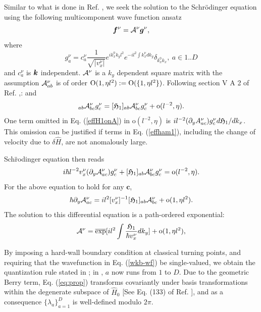 \documentclass[aps, showpacs, twocolumn, notitlepage, superscriptaddress]{revtex4-1}
\begin{document}
Similar to what is done in Ref. , we seek the solution to the Schr\"odinger equation using the following multicomponent wave function ansatz
\begin{equation}
\boldsymbol{f}^\nu={\cal A}^\nu\boldsymbol{g}^\nu,\label{wkb-wf}
\end{equation}
where 
\begin{equation}
g_a^\nu=c_{a}^\nu\frac{1}{\sqrt{|v_x^\nu|}}e^{ik^{0}_{x}k_{y}l^{2}}e^{-il^{2}\int k_{x}^\nu dk_{y}}\delta_{k^{0}_{x}k_{x}},~a\in{1..D}
\end{equation}
and $c_a^\nu$ is $\boldsymbol{k}$ independent. ${\cal A}^\nu$ is a $k_y$ dependent square matrix with the assumption ${\cal A}_{ab}^\nu$ is of order $\text{O}(1, \eta l^2):=\text{O}(\{1,\eta l^2\})$. Following section V A 2 of Ref. ,:
and
\begin{equation}
[\effH_{1}(\bK)]_{ab}\A_{bc}^\nu g_{c}^\nu=[\effH_{1}]_{ab}\A_{bc}^\nu g_{c}^\nu+\text{o}(l^{-2}, \eta).\label{effH1onA}
\end{equation}
One term omitted in Eq. (\ref{effH1onA}) in $\text{o}(l^{-2},\eta)$ is $i l^{-2}(\partial_{y}A_{ac}^\nu)g_{c}^\nu d\mathfrak{H}_1/dk_x$. This omission can be justified if terms in Eq. ({\ref{effham1}}), including the change of velocity due to $\delta\hat{H}$, are not anomalously large.

Sch\"rodinger equation then reads 
\begin{equation}
i\hbar l^{-2} v_{x}^\nu (\partial_{y}{\cal A}_{ac}^\nu)  g_{c}^\nu+[\mathfrak{H}_{1}]_{ab}{\cal A}_{bc}^\nu g_{c}^\nu=\text{o}(l^{-2}, \eta).
\end{equation}
For the above equation to hold for any $\mathbf{c}$,
\begin{equation}
\hbar\partial_{y}{\cal A}_{ac}^\nu=il^{2}[v_{x}^\nu]^{-1}[\mathfrak{H}_{1}]_{ab}{\cal A}_{bc}^\nu+{\text{o}(1, \eta l^2)}.
\end{equation}
The solution to this differential equation is a path-ordered exponential:
\begin{equation}
{\cal A}^\nu=\overline{\exp}[il^{2}\int\frac{\mathfrak{H}_{1}}{\hbar v_{x}^\nu}dk_{y}]+{\text{o}(1, \eta l^2)},
\end{equation}

By imposing a hard-wall boundary condition at classical turning points, and requiring that the wavefunction in Eq. (\ref{wkb-wf}) be single-valued,\cite{100p} we obtain the quantization rule  stated in ; in , $a$ now runs from $1$ to $D$. Due to the geometric Berry term, Eq. ({\ref{eq:prop}}) transforms covariantly under basis transformations within the degenerate subspace of $\hat{H}_0$ [See Eq. (133) of Ref. ], and as a consequence $\{\lambda_a\}_{a=1}^D$ is well-defined modulo $2\pi$.
\end{document}

